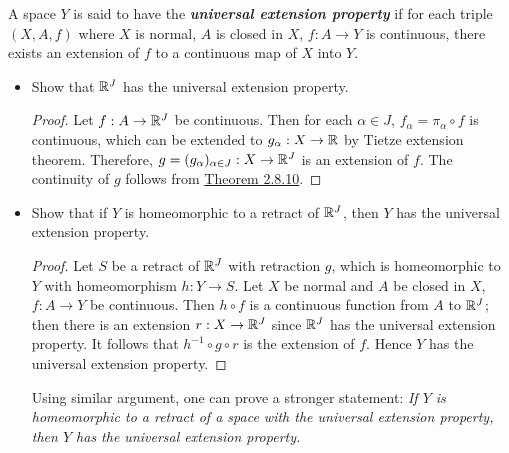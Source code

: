 \documentclass[12pt,a4paper]{article}
\begin{document}
    \begin{ex}
        A space $Y$ is said to have the \textbf{\textit{universal extension property}} if for each triple $(X,A,f)$ where $X$ is normal, $A$ is closed in $X$, $f:A\to Y$ is continuous, there exists an extension of $f$ to a continuous map of $X$ into $Y$.
        \begin{itemize}
            \item Show that $\mathbb{R}^J$ has the universal extension property.
            \begin{proof}
                Let $f:A\to\mathbb{R}^J$ be continuous. Then for each $\alpha\in J$, $f_\alpha=\pi_\alpha\circ f$ is continuous, which can be extended to $g_\alpha:X\to\mathbb{R}$ by Tietze extension theorem. Therefore, $g=(g_\alpha)_{\alpha\in J}:X\to \mathbb{R}^J$ is an extension of $f$. The continuity of $g$ follows from \hyperref[2.8.10]{Theorem 2.8.10}.
            \end{proof}
            \item Show that if $Y$ is homeomorphic to a retract of $\mathbb{R}^J$, then $Y$ has the universal extension property.
            \begin{proof}
                Let $S$ be a retract of $\mathbb{R}^J$ with retraction $g$, which is homeomorphic to $Y$ with homeomorphism $h:Y\to S$. Let $X$ be normal and $A$ be closed in $X$, $f:A\to Y$ be continuous. Then $h\circ f$ is a continuous function from $A$ to $\mathbb{R}^J$; then there is an extension $r:X\to \mathbb{R}^J$ since $\mathbb{R}^J$ has the universal extension property. It follows that $h^{-1}\circ g\circ r$ is the extension of $f$. Hence $Y$ has the universal extension property.
            \end{proof}
            \begin{remark}
                Using similar argument, one can prove a stronger statement: \textit{If $Y$ is homeomorphic to a retract of a space with the universal extension property, then $Y$ has the universal extension property.}
            \end{remark}
        \end{itemize}
    \end{ex}
    \hfill
\end{document}
